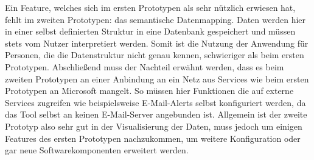Ein Feature, welches sich im ersten Prototypen als sehr nützlich erwiesen hat, fehlt im zweiten Prototypen: das semantische Datenmapping. Daten werden hier in einer selbst definierten Struktur in eine Datenbank gespeichert und müssen stets vom Nutzer interpretiert werden. Somit ist die Nutzung der Anwendung für Personen, die die Datenstruktur nicht genau kennen, schwieriger als beim ersten Prototypen. Abschließend muss der Nachteil erwähnt werden, dass es beim zweiten Prototypen an einer Anbindung an ein Netz aus Services wie beim ersten Prototypen an Microsoft mangelt. So müssen hier Funktionen die auf externe Services zugreifen wie beispielsweise E-Mail-Alerts selbst konfiguriert werden, da das Tool selbst an keinen E-Mail-Server angebunden ist. Allgemein ist der zweite Prototyp also sehr gut in der Visualisierung der Daten, muss jedoch um einigen Features des ersten Prototypen nachzukommen, um weitere Konfiguration oder gar neue Softwarekomponenten erweitert werden.

